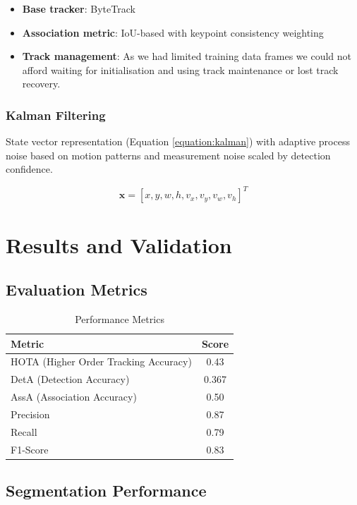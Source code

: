 \documentclass[11pt]{article}
\begin{document}
\begin{itemize}[noitemsep]
    \item \textbf{Base tracker}: ByteTrack \cite{zhang_bytetrack_2022}
    \item \textbf{Association metric}: IoU-based with keypoint consistency weighting
    \item \textbf{Track management}: As we had limited training data frames we could not afford waiting for initialisation and using track maintenance or lost track recovery.
\end{itemize}

\subsubsection{Kalman Filtering}

State vector representation (Equation \ref{equation:kalman}) with adaptive process noise based on motion patterns and measurement noise scaled by detection confidence.

\begin{equation}
\label{equation:kalman}
\mathbf{x} = [x, y, w, h, v_x, v_y, v_w, v_h]^T
\end{equation}

\section{Results and Validation}

\subsection{Evaluation Metrics}

\begin{table}[h]
\centering
\caption{Performance Metrics}
\begin{tabular}{lc}
\toprule
\textbf{Metric} & \textbf{Score} \\
\midrule
HOTA (Higher Order Tracking Accuracy) & 0.43 \\
DetA (Detection Accuracy) &  0.367 \\
AssA (Association Accuracy) & 0.50 \\
Precision & 0.87 \\
Recall & 0.79 \\
F1-Score & 0.83 \\
\bottomrule
\end{tabular}
\end{table}

\subsection{Segmentation Performance}
\end{document}
